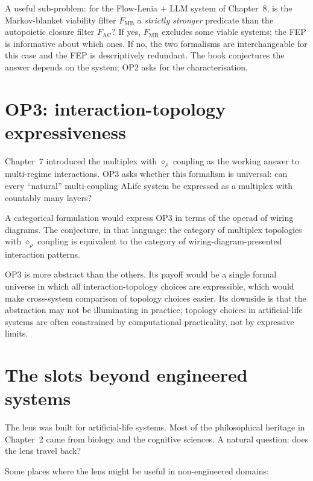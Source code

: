 A useful sub-problem: for the Flow-Lenia + LLM system of Chapter~8,
is the Markov-blanket viability filter $F_{\mathrm{MB}}$ a
\emph{strictly stronger} predicate than the autopoietic closure
filter $F_{\mathrm{AC}}$? If yes, $F_{\mathrm{MB}}$ excludes some
viable systems; the FEP is informative about which ones. If no, the
two formalisms are interchangeable for this case and the FEP is
descriptively redundant. The book conjectures the answer depends on
the system; OP2 asks for the characterisation.

\section{OP3: interaction-topology expressiveness}

Chapter~7 introduced the multiplex with $\diamond_\rho$ coupling as
the working answer to multi-regime interactions. OP3 asks whether
this formalism is universal: can every ``natural'' multi-coupling
ALife system be expressed as a multiplex with countably many layers?

A categorical formulation would express OP3 in terms of the operad of
wiring diagrams. The conjecture, in that language: the category of
multiplex topologies with $\diamond_\rho$ coupling is equivalent to
the category of wiring-diagram-presented interaction patterns.

OP3 is more abstract than the others. Its payoff would be a single
formal universe in which all interaction-topology choices are
expressible, which would make cross-system comparison of topology
choices easier. Its downside is that the abstraction may not be
illuminating in practice; topology choices in artificial-life
systems are often constrained by computational practicality, not by
expressive limits.

\section{The slots beyond engineered systems}

The lens was built for artificial-life systems. Most of the
philosophical heritage in Chapter~2 came from biology and the
cognitive sciences. A natural question: does the lens travel back?

Some places where the lens might be useful in non-engineered domains:

